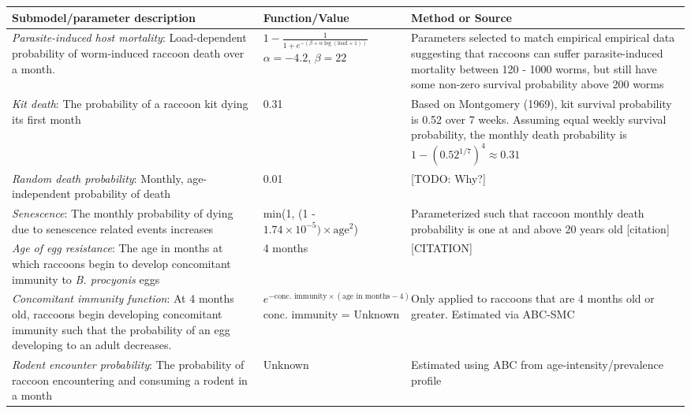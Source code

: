\documentclass[11pt]{article}
\begin{document}
\linespread{1}
\scriptsize
\renewcommand{\arraystretch}{1.2}
\begin{longtable}{p{4cm} p{4cm} p{5cm}}
\toprule
\textbf{Submodel/parameter description} & \textbf{Function/Value} & \textbf{Method or Source} \\
\midrule
\emph{Parasite-induced host mortality}: Load-dependent
probability of worm-induced raccoon death over a month. &
$1 - \frac{1}{1 + e^{-(\beta + \alpha \log(\text{load} + 1))}}$ \newline\newline $\alpha = -4.2$, $\beta = 22$ & Parameters selected to match empirical empirical data suggesting that raccoons can suffer parasite-induced mortality between 120 - 1000 worms, but still have some non-zero survival probability above 200 worms \citep{Kazacos2001} \\
\hline
\emph{Kit death}: The probability of a raccoon kit dying its first month & 0.31 & Based on Montgomery (1969), kit survival probability is 0.52 over 7 weeks. Assuming equal weekly survival probability, the monthly death probability is $1 - (0.52^{1/7})^4 \approx 0.31$   \\
\hline
\emph{Random death probability}: Monthly, age-independent probability of death & 0.01 & [TODO: Why?] \\
\hline
\emph{Senescence}: The monthly probability of dying due to senescence related events increases & min(1, (1 - $1.74\times10^{-5}) \times \text{age}^2$) & Parameterized such that raccoon monthly death probability is one at and above 20 years old [citation] \\
\hline
\emph{Age of egg resistance}: The age in months at which raccoons begin to develop concomitant immunity to \emph{B. procyonis} eggs & 4 months & [CITATION]  \\
\hline
\emph{Concomitant immunity function}: At 4 months old, raccoons begin developing concomitant immunity such that the probability of an egg developing to an adult decreases. & $e^{-\text{conc. immunity} \times (\text{age in months} - 4)}$ \newline\newline conc. immunity = Unknown  &  Only applied to raccoons that are 4 months old or greater. Estimated via ABC-SMC \\
\hline
\emph{Rodent encounter probability}: The probability of raccoon encountering and consuming a rodent in a month & Unknown & Estimated using ABC from age-intensity/prevalence profile \citep{Weinstein2016}\\

\end{longtable}
\end{document}
